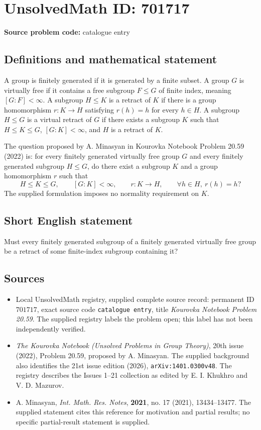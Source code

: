 \documentclass[11pt]{article}
\begin{document}
\section*{UnsolvedMath ID: 701717}
\textbf{Source problem code:} catalogue entry
\subsection{Definitions and mathematical statement}
A group is finitely generated if it is generated by a finite subset. A group \(G\) is virtually free if it contains a free subgroup \(F\leq G\) of finite index, meaning \([G:F]<\infty\). A subgroup \(H\leq K\) is a retract of \(K\) if there is a group homomorphism \(r:K\to H\) satisfying \(r(h)=h\) for every \(h\in H\). A subgroup \(H\leq G\) is a virtual retract of \(G\) if there exists a subgroup \(K\) such that \(H\leq K\leq G\), \([G:K]<\infty\), and \(H\) is a retract of \(K\).

The question proposed by A. Minasyan in Kourovka Notebook Problem 20.59 (2022) is: for every finitely generated virtually free group \(G\) and every finitely generated subgroup \(H\leq G\), do there exist a subgroup \(K\) and a group homomorphism \(r\) such that
\[
H\leq K\leq G,\qquad [G:K]<\infty,\qquad r:K\to H,\qquad \forall h\in H,\ r(h)=h?
\]
The supplied formulation imposes no normality requirement on \(K\).
\subsection{Short English statement}
Must every finitely generated subgroup of a finitely generated virtually free group be a retract of some finite-index subgroup containing it?
\subsection{Sources}
\begin{itemize}
\item Local UnsolvedMath registry, supplied complete source record: permanent ID \(701717\), exact source code \texttt{catalogue entry}, title \emph{Kourovka Notebook Problem 20.59}. The supplied registry labels the problem open; this label has not been independently verified.
\item \emph{The Kourovka Notebook (Unsolved Problems in Group Theory)}, 20th issue (2022), Problem 20.59, proposed by A. Minasyan. The supplied background also identifies the 21st issue edition (2026), \texttt{arXiv:1401.0300v48}. The registry describes the Issues 1--21 collection as edited by E. I. Khukhro and V. D. Mazurov.
\item A. Minasyan, \emph{Int. Math. Res. Notes}, \textbf{2021}, no. 17 (2021), 13434--13477. The supplied statement cites this reference for motivation and partial results; no specific partial-result statement is supplied.
\end{itemize}
\end{document}
